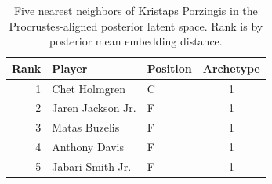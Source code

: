 \begin{table}[htbp]
  \centering\small
  \begin{tabular}{rllc}
    \toprule
    Rank & Player & Position & Archetype \\
    \midrule
    1 & Chet Holmgren & C & 1 \\
    2 & Jaren Jackson Jr. & F & 1 \\
    3 & Matas Buzelis & F & 1 \\
    4 & Anthony Davis & F & 1 \\
    5 & Jabari Smith Jr. & F & 1 \\
    \bottomrule
  \end{tabular}
  \caption{Five nearest neighbors of Kristaps Porzingis in the Procrustes-aligned posterior latent space. Rank is by posterior mean embedding distance.}
  \label{tab:Kristaps_Porzingis_neighbors}
\end{table}


